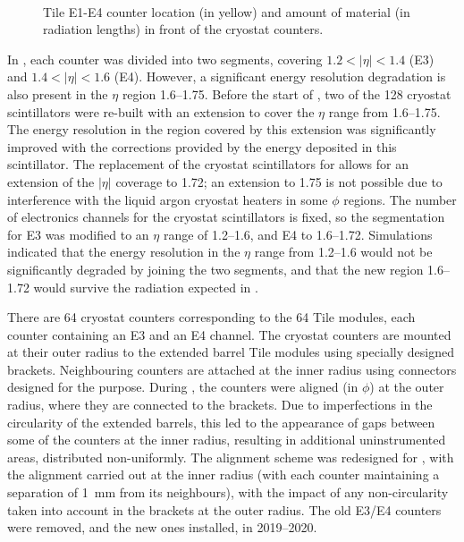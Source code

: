 \documentclass[cernpreprint, atlasdraft=false, UKenglish,british,orcidlogo, texmf, orcidlogo]{atlasdoc}
\begin{document}
\begin{figure}[h!]
\centering
{}\\
\caption{\protect{} Tile E1-E4 counter location (in yellow) and \protect{} amount of material (in radiation lengths) in front of the cryostat counters.
}
\label{fig_atlas_crack}
\end{figure}
 
In \RunOneTwo, each counter was divided into two segments, covering $1.2 < |\eta| < 1.4$ (E3)  and $1.4 < |\eta| < 1.6$ (E4). However, a significant energy resolution degradation is also present in the $\eta$ region \numrange[range-phrase=--]{1.6}{1.75}.
Before the start of \RunTwo, two of the 128 cryostat scintillators were re-built with an extension to cover the $\eta$ range from \numrange[range-phrase=--]{1.6}{1.75}. The energy resolution in the region covered by this extension was significantly improved with the corrections provided by the energy deposited in this scintillator. The replacement of the cryostat scintillators for \RunThr allows for an extension of the $|\eta|$ coverage to 1.72; an extension to 1.75 is not possible  due to interference with the liquid argon cryostat heaters in some $\phi$ regions.  The number of electronics channels for the cryostat scintillators is fixed, so the segmentation for E3 was modified to an $\eta$ range of \numrange[range-phrase=--]{1.2}{1.6}, and E4 to \numrange[range-phrase=--]{1.6}{1.72}. Simulations indicated that the energy resolution in the $\eta$ range from \numrange[range-phrase=--]{1.2}{1.6} would not be significantly degraded by joining the two segments, and that the new region \numrange[range-phrase=--]{1.6}{1.72} would survive the radiation  expected in \RunThr.
 
There are 64 cryostat counters corresponding to the 64 \gls{Tile} modules, each counter containing an E3 and an E4 channel. The cryostat counters are mounted at their outer radius to the extended barrel \gls{Tile} modules using specially designed brackets. Neighbouring counters are  attached at the inner radius using connectors designed for the purpose.  During \RunOneTwo, the counters were
aligned (in $\phi$) at the outer radius, where they are connected to the brackets. Due to imperfections in the circularity of the extended
barrels, this led to the appearance of gaps between some of the counters at the inner radius, resulting in additional uninstrumented areas, distributed non-uniformly. The alignment scheme was redesigned for \RunThr, with the alignment carried out at the inner radius (with each counter maintaining a separation of \SI{1}{\mm} from its neighbours), with the impact of any non-circularity taken into account in the brackets at the outer radius. The old E3/E4 counters were removed, and the new ones installed, in 2019--2020.
 
\end{document}
